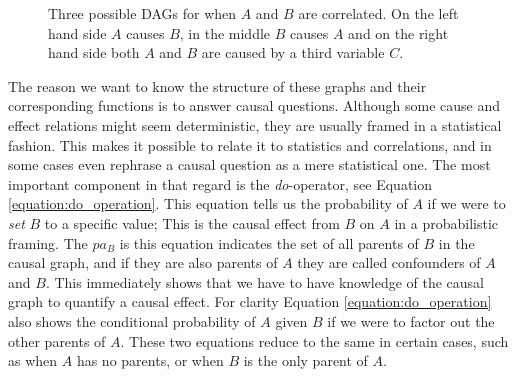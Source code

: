 \documentclass{article}
\begin{document}
\begin{figure}
    \centering
    \qquad
    \qquad
    \caption{Three possible DAGs for when $A$ and $B$ are correlated. On the left hand side $A$ causes $B$, in the middle $B$ causes $A$ and on the right hand side both $A$ and $B$ are caused by a third variable $C$.}
    \label{fig:graph_correlations_A_B}
\end{figure}

The reason we want to know the structure of these graphs and their corresponding functions is to answer causal questions. Although some cause and effect relations might seem deterministic, they are usually framed in a statistical fashion. This makes it possible to relate it to statistics and correlations, and in some cases even rephrase a causal question as a mere statistical one. The most important component in that regard is the \textit{do}-operator, see Equation \ref{equation:do_operation}. This equation tells us the probability of $A$ if we were to \textit{set} $B$ to a specific value; This is the causal effect from $B$ on $A$ in a probabilistic framing. The $pa_{B}$ is this equation indicates the set of all parents of $B$ in the causal graph, and if they are also parents of $A$ they are called confounders of $A$ and $B$. This immediately shows that we have to have knowledge of the causal graph to quantify a causal effect. For clarity  Equation \ref{equation:do_operation} also shows the conditional probability of $A$ given $B$ if we were to factor out the other parents of $A$. These two equations reduce to the same in certain cases, such as when $A$ has no parents, or when $B$ is the only parent of $A$. 
\end{document}
